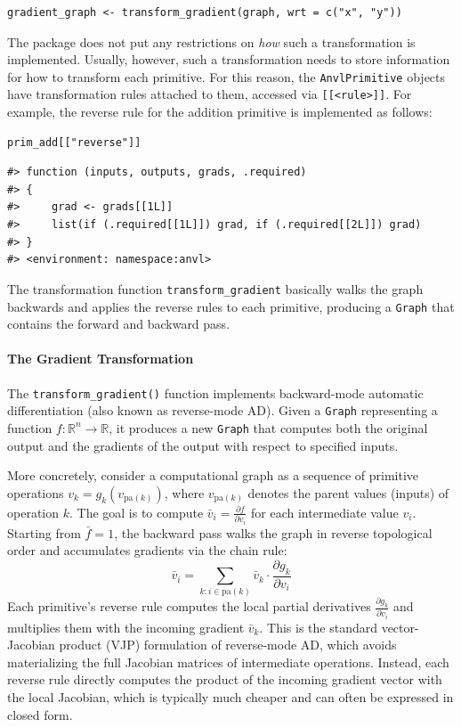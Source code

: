 \begin{verbatim}
gradient_graph <- transform_gradient(graph, wrt = c("x", "y"))
\end{verbatim}

The  package does not put any restrictions on \emph{how} such a transformation is implemented.
Usually, however, such a transformation needs to store information for how to transform each primitive.
For this reason, the \texttt{AnvlPrimitive} objects have transformation rules attached to them, accessed via \texttt{{[}{[}\textless{}rule\textgreater{}{]}{]}}.
For example, the reverse rule for the addition primitive is implemented as follows:

\begin{verbatim}
prim_add[["reverse"]]
\end{verbatim}

\begin{verbatim}
#> function (inputs, outputs, grads, .required) 
#> {
#>     grad <- grads[[1L]]
#>     list(if (.required[[1L]]) grad, if (.required[[2L]]) grad)
#> }
#> <environment: namespace:anvl>
\end{verbatim}

The transformation function \texttt{transform\_gradient} basically walks the graph backwards and applies the reverse rules to each primitive, producing a \texttt{Graph} that contains the forward and backward pass.

\paragraph{The Gradient Transformation}\label{the-gradient-transformation}

The \texttt{transform\_gradient()} function implements backward-mode automatic differentiation (also known as reverse-mode AD).
Given a \texttt{Graph} representing a function \(f : \mathbb{R}^n \to \mathbb{R}\), it produces a new \texttt{Graph} that computes both the original output and the gradients of the output with respect to specified inputs.

More concretely, consider a computational graph as a sequence of primitive operations \(v_k = g_k(v_{\text{pa}(k)})\), where \(v_{\text{pa}(k)}\) denotes the parent values (inputs) of operation \(k\).
The goal is to compute \(\bar{v}_i = \frac{\partial f}{\partial v_i}\) for each intermediate value \(v_i\).
Starting from \(\bar{f} = 1\), the backward pass walks the graph in reverse topological order and accumulates gradients via the chain rule:
\[\bar{v}_i = \sum_{k : i \in \text{pa}(k)} \bar{v}_k \cdot \frac{\partial g_k}{\partial v_i}\]
Each primitive's reverse rule computes the local partial derivatives \(\frac{\partial g_k}{\partial v_i}\) and multiplies them with the incoming gradient \(\bar{v}_k\).
This is the standard vector-Jacobian product (VJP) formulation of reverse-mode AD, which avoids materializing the full Jacobian matrices of intermediate operations.
Instead, each reverse rule directly computes the product of the incoming gradient vector with the local Jacobian, which is typically much cheaper and can often be expressed in closed form.

